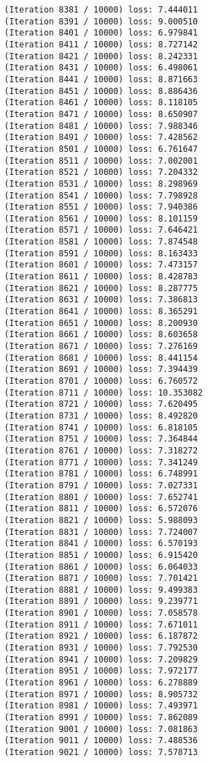 \documentclass[11pt]{article}
\begin{document}
\begin{Verbatim}[commandchars=\\\{\}]
(Iteration 8381 / 10000) loss: 7.444011
(Iteration 8391 / 10000) loss: 9.000510
(Iteration 8401 / 10000) loss: 6.979841
(Iteration 8411 / 10000) loss: 8.727142
(Iteration 8421 / 10000) loss: 8.242331
(Iteration 8431 / 10000) loss: 6.498061
(Iteration 8441 / 10000) loss: 8.871663
(Iteration 8451 / 10000) loss: 8.886436
(Iteration 8461 / 10000) loss: 8.118105
(Iteration 8471 / 10000) loss: 8.650907
(Iteration 8481 / 10000) loss: 7.988346
(Iteration 8491 / 10000) loss: 7.428562
(Iteration 8501 / 10000) loss: 6.761647
(Iteration 8511 / 10000) loss: 7.002001
(Iteration 8521 / 10000) loss: 7.204332
(Iteration 8531 / 10000) loss: 8.298969
(Iteration 8541 / 10000) loss: 7.798928
(Iteration 8551 / 10000) loss: 7.940386
(Iteration 8561 / 10000) loss: 8.101159
(Iteration 8571 / 10000) loss: 7.646421
(Iteration 8581 / 10000) loss: 7.874548
(Iteration 8591 / 10000) loss: 8.163433
(Iteration 8601 / 10000) loss: 7.473157
(Iteration 8611 / 10000) loss: 8.428783
(Iteration 8621 / 10000) loss: 8.287775
(Iteration 8631 / 10000) loss: 7.386813
(Iteration 8641 / 10000) loss: 8.365291
(Iteration 8651 / 10000) loss: 8.200930
(Iteration 8661 / 10000) loss: 8.603658
(Iteration 8671 / 10000) loss: 7.276169
(Iteration 8681 / 10000) loss: 8.441154
(Iteration 8691 / 10000) loss: 7.394439
(Iteration 8701 / 10000) loss: 6.760572
(Iteration 8711 / 10000) loss: 10.353082
(Iteration 8721 / 10000) loss: 7.620495
(Iteration 8731 / 10000) loss: 8.492820
(Iteration 8741 / 10000) loss: 6.818105
(Iteration 8751 / 10000) loss: 7.364844
(Iteration 8761 / 10000) loss: 7.318272
(Iteration 8771 / 10000) loss: 7.341249
(Iteration 8781 / 10000) loss: 6.748991
(Iteration 8791 / 10000) loss: 7.027331
(Iteration 8801 / 10000) loss: 7.652741
(Iteration 8811 / 10000) loss: 6.572076
(Iteration 8821 / 10000) loss: 5.988093
(Iteration 8831 / 10000) loss: 7.724007
(Iteration 8841 / 10000) loss: 6.570193
(Iteration 8851 / 10000) loss: 6.915420
(Iteration 8861 / 10000) loss: 6.064033
(Iteration 8871 / 10000) loss: 7.701421
(Iteration 8881 / 10000) loss: 9.499383
(Iteration 8891 / 10000) loss: 9.239771
(Iteration 8901 / 10000) loss: 7.058578
(Iteration 8911 / 10000) loss: 7.671011
(Iteration 8921 / 10000) loss: 6.187872
(Iteration 8931 / 10000) loss: 7.792530
(Iteration 8941 / 10000) loss: 7.209829
(Iteration 8951 / 10000) loss: 7.972177
(Iteration 8961 / 10000) loss: 6.278889
(Iteration 8971 / 10000) loss: 8.905732
(Iteration 8981 / 10000) loss: 7.493971
(Iteration 8991 / 10000) loss: 7.862089
(Iteration 9001 / 10000) loss: 7.081863
(Iteration 9011 / 10000) loss: 7.488536
(Iteration 9021 / 10000) loss: 7.578713

\end{Verbatim}
\end{document}

